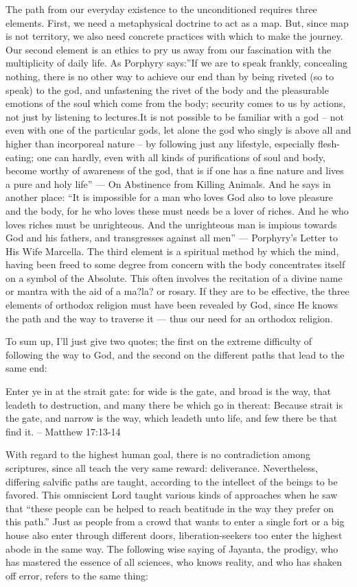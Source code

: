 \begin{footnotesize}
\begin{sffamily}
The path from our everyday existence to the unconditioned requires three elements. First, we need a metaphysical doctrine to act as a map. But, since map is not territory, we also need concrete practices with which to make the journey. Our second element is an ethics to pry us away from our fascination with the multiplicity of daily life. As Porphyry says:''If we are to speak frankly, concealing nothing, there is no other way to achieve our end than by being riveted (so to speak) to the god, and unfastening the rivet of the body and the pleasurable emotions of the soul which come from the body; security comes to us by actions, not just by listening to lectures.It is not possible to be familiar with a god -- not even with one of the particular gods, let alone the god who singly is above all and higher than incorporeal nature -- by following just any lifestyle, especially flesh-eating; one can hardly, even with all kinds of purifications of soul and body, become worthy of awareness of the god, that is if one has a fine nature and lives a pure and holy life'' --- On Abstinence from Killing Animals. And he says in another place: ``It is impossible for a man who loves God also to love pleasure and the body, for he who loves these must needs be a lover of riches. And he who loves riches must be unrighteous. And the unrighteous man is impious towards God and his fathers, and transgresses against all men'' --- Porphyry's Letter to His Wife Marcella. The third element is a spiritual method by which the mind, having been freed to some degree from concern with the body concentrates itself on a symbol of the Absolute. This often involves the recitation of a divine name or mantra with the aid of a ma?la? or rosary. If they are to be effective, the three elements of orthodox religion must have been revealed by God, since He knows the path and the way to traverse it --- thus our need for an orthodox religion.

To sum up, I'll just give two quotes; the first on the extreme difficulty of following the way to God, and the second on the different paths that lead to the same end:

Enter ye in at the strait gate: for wide is the gate, and broad is the way, that leadeth to destruction, and many there be which go in thereat: Because strait is the gate, and narrow is the way, which leadeth unto life, and few there be that find it. -- Matthew 17:13-14

With regard to the highest human goal, there is no contradiction among scriptures, since all teach the very same reward: deliverance. Nevertheless, differing salvific paths are taught, according to the intellect of the beings to be favored. This omniscient Lord taught various kinds of approaches when he saw that ``these people can be helped to reach beatitude in the way they prefer on this path.'' Just as people from a crowd that wants to enter a single fort or a big house also enter through different doors, liberation-seekers too enter the highest abode in the same way. The following wise saying of Jayanta, the prodigy, who has mastered the essence of all sciences, who knows reality, and who has shaken off error, refers to the same thing:


\end{sffamily}
\end{footnotesize}
